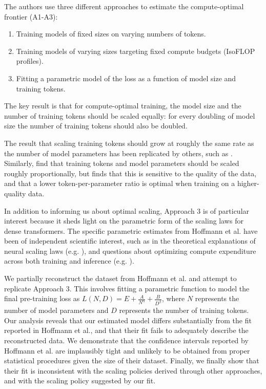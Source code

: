 \documentclass[twocolumn]{article}
\begin{document}
The authors use three different approaches to estimate the compute-optimal frontier (A1-A3):
\begin{enumerate}[label=A\arabic*]
    \item Training models of fixed sizes on varying numbers of tokens.
    \item Training models of varying sizes targeting fixed compute budgets (IsoFLOP profiles).
    \item Fitting a parametric model of the loss as a function of model size and training tokens.
\end{enumerate}
The key result is that for compute-optimal training, the model size and the number of training tokens should be scaled equally: for every doubling of model size the number of training tokens should also be doubled.

The result that scaling training tokens should grow at roughly the same rate as the number of model parameters has been replicated by others, such as \cite{anil2023palm}. Similarly, \cite{bi2024deepseek} find that training tokens and model parameters should be scaled roughly proportionally, but finds that this is sensitive to the quality of the data, and that a lower token-per-parameter ratio is optimal when training on a higher-quality data.

In addition to informing us about optimal scaling, Approach 3 is of particular interest because it sheds light on the parametric form of the scaling laws for dense transformers. The specific parametric estimates from Hoffmann et al. have been of independent scientific interest, such as in the theoretical explanations of neural scaling laws (e.g. \citealt{michaud2024quantization, bordelon2024dynamical}), and questions about optimizing compute expenditure across both training and inference (e.g. \citealt{sardana2023beyond}). 

We partially reconstruct the dataset from Hoffmann et al. and attempt to replicate Approach 3. This involves fitting a parametric function to model the final pre-training loss as $L(N, D) = E + \frac{A}{N^\alpha} + \frac{B}{D^\beta}$, where $N$ represents the number of model parameters and $D$ represents the number of training tokens. Our analysis reveals that our estimated model differs substantially from the fit reported in Hoffmann et al., and that their fit fails to adequately describe the reconstructed data. We demonstrate that the confidence intervals reported by Hoffmann et al. are implausibly tight and unlikely to be obtained from proper statistical procedures given the size of their dataset. Finally, we finally show that their fit is inconsistent with the scaling policies derived through other approaches, and with the scaling policy suggested by our fit. 
\end{document}
